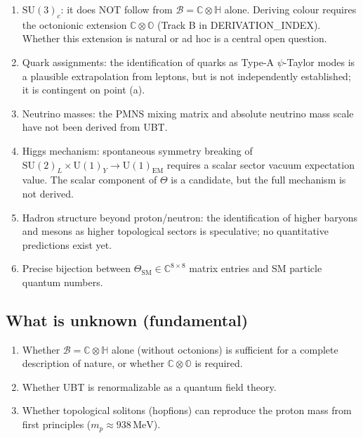 \documentclass[12pt,a4paper]{article}
\theoremstyle{remark}
\newcommand{\B}{\mathcal{B}}
\newcommand{\C}{\mathbb{C}}
\newcommand{\H}{\mathbb{H}}
\begin{document}
\begin{enumerate}[label=(\alph*)]
  \item $\mathrm{SU}(3)_c$: it does NOT follow from $\B = \C\otimes\H$ alone.
        Deriving colour requires the octonionic extension
        $\C\otimes\mathbb{O}$ (Track B in DERIVATION\_INDEX).  Whether this
        extension is natural or ad hoc is a central open question.
  \item Quark assignments: the identification of quarks as Type-A
        $\psi$-Taylor modes is a plausible extrapolation from leptons, but
        is not independently established; it is contingent on point (a).
  \item Neutrino masses: the PMNS mixing matrix and absolute neutrino mass
        scale have not been derived from UBT.
  \item Higgs mechanism: spontaneous symmetry breaking of
        $\mathrm{SU}(2)_L\times\mathrm{U}(1)_Y\to\mathrm{U}(1)_{\mathrm{EM}}$
        requires a scalar sector vacuum expectation value.  The scalar
        component of $\Theta$ is a candidate, but the full mechanism is
        not derived.
  \item Hadron structure beyond proton/neutron: the identification of
        higher baryons and mesons as higher topological sectors is
        speculative; no quantitative predictions exist yet.
  \item Precise bijection between $\Theta_{\mathrm{SM}}\in\C^{8\times 8}$
        matrix entries and SM particle quantum numbers.
\end{enumerate}

\subsection{What is unknown (fundamental)}

\begin{enumerate}[label=(\alph*)]
  \item Whether $\B = \C\otimes\H$ alone (without octonions) is sufficient
        for a complete description of nature, or whether $\C\otimes\mathbb{O}$
        is required.
  \item Whether UBT is renormalizable as a quantum field theory.
  \item Whether topological solitons (hopfions) can reproduce the proton
        mass from first principles ($m_p \approx 938\,\mathrm{MeV}$).
\end{enumerate}

\end{document}
